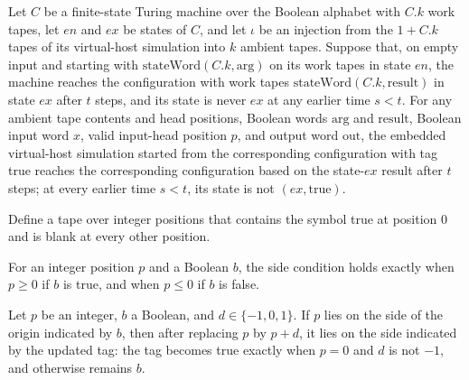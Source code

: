 \begin{theorem}
\label{Turing.oracleRelocatedCall}
\leanok
{}
Let $C$ be a finite-state Turing machine over the Boolean alphabet with $C.k$ work
tapes, let $en$ and $ex$ be states of $C$, and let $\iota$ be an injection from the
$1+C.k$ tapes of its virtual-host simulation into $k$ ambient tapes. Suppose that, on
empty input and starting with $\mathrm{stateWord}(C.k,\mathrm{arg})$ on its work tapes
in state $en$, the machine reaches the configuration with work tapes
$\mathrm{stateWord}(C.k,\mathrm{result})$ in state $ex$ after $t$ steps, and its state
is never $ex$ at any earlier time $s<t$. For any ambient tape contents and head
positions, Boolean words $\mathrm{arg}$ and $\mathrm{result}$, Boolean input word $x$,
valid input-head position $p$, and output word $\mathrm{out}$, the embedded virtual-host
simulation started from the corresponding configuration with tag true reaches the
corresponding configuration based on the state-$ex$ result after $t$ steps; at every
earlier time $s<t$, its state is not $(ex,\mathrm{true})$.
\end{theorem}

\begin{definition}
\label{Turing.oracleOrigin}
\leanok
Define a tape over integer positions that contains the symbol true at position $0$ and
is blank at every other position.
\end{definition}

\begin{definition}
\label{Turing.oracleSide}
\leanok
For an integer position $p$ and a Boolean $b$, the side condition holds exactly when
$p\geq 0$ if $b$ is true, and when $p\leq 0$ if $b$ is false.
\end{definition}

\begin{theorem}
\label{Turing.oracleSide_move}
\leanok
{}
Let $p$ be an integer, $b$ a Boolean, and $d\in\{-1,0,1\}$. If $p$ lies on the side of
the origin indicated by $b$, then after replacing $p$ by $p+d$, it lies on the side
indicated by the updated tag: the tag becomes true exactly when $p=0$ and $d$ is not
$-1$, and otherwise remains $b$.
\end{theorem}

